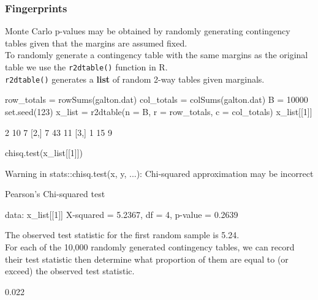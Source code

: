 \documentclass[a4paper]{article}\usepackage[]{graphicx}\usepackage[]{xcolor}
\begin{document}
\subsubsection{Fingerprints}
Monte Carlo p-values may be obtained by randomly generating contingency tables given that the margins are assumed fixed.\\
To randomly generate a contingency table with the same margins as the original table we use the \lstinline|r2dtable()| function in R.\\
\lstinline|r2dtable()| generates a \textbf{list} of random 2-way tables given marginals.
\begin{Schunk}
\begin{Sinput}
row_totals = rowSums(galton.dat)
col_totals = colSums(galton.dat)
B = 10000
set.seed(123)
x_list = r2dtable(n = B, 
                  r = row_totals,
                  c = col_totals)
x_list[[1]]
\end{Sinput}
\begin{Soutput}
     [,1] [,2] [,3]
[1,]    2   10    7
[2,]    7   43   11
[3,]    1   15    9
\end{Soutput}
\begin{Sinput}
chisq.test(x_list[[1]])
\end{Sinput}
\begin{Soutput}
Warning in stats::chisq.test(x, y, ...): Chi-squared approximation may be incorrect
\end{Soutput}
\begin{Soutput}

	Pearson's Chi-squared test

data:  x_list[[1]]
X-squared = 5.2367, df = 4, p-value = 0.2639
\end{Soutput}
\end{Schunk}
The observed test statistic for the first random sample is 5.24.\\
For each of the 10,000 randomly generated contingency tables, we can record their test statistic then determine what proportion of them are equal to (or exceed) the observed test statistic.
\begin{Schunk}
\begin{Soutput}
[1] 0.022
\end{Soutput}
\end{Schunk}
\end{document}
